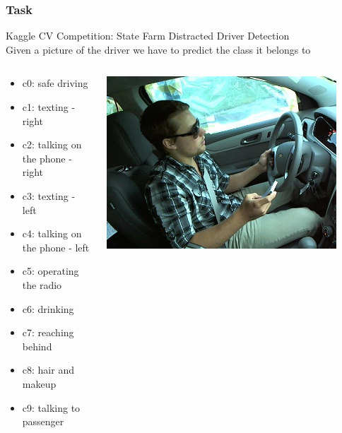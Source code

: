 \documentclass{beamer}
\begin{document}
	
	\begin{frame}
		\frametitle{Task}
		Kaggle CV Competition: State Farm Distracted Driver Detection \\
		Given a picture of the driver we have to predict the class it belongs to
		
		\begin{columns}
			\begin{column}{0.5\textwidth}
				\begin{itemize}
					\item c0: safe driving
					\item c1: texting - right
					\item c2: talking on the phone - right
					\item c3: texting - left
					\item c4: talking on the phone - left
					\item c5: operating the radio
					\item c6: drinking
					\item c7: reaching behind
					\item c8: hair and makeup
					\item c9: talking to passenger			
				\end{itemize}
			\end{column}
			\begin{column}{0.5\textwidth}  %
				\begin{center}
					\includegraphics[width=0.9\textwidth]{img_6}
				\end{center}
			\end{column}
		\end{columns}
	\end{frame}
\end{document}
